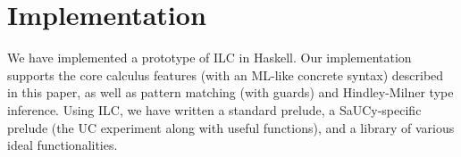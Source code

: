 \section{Implementation}
\label{sec:implementation}

We have implemented a prototype of ILC in Haskell. Our implementation supports
the core calculus features (with an ML-like concrete syntax) described in this
paper, as well as pattern matching (with guards) and Hindley-Milner type
inference. Using ILC, we have written a standard prelude, a SaUCy-specific
prelude (the UC experiment along with useful functions), and a library of
various ideal functionalities.
